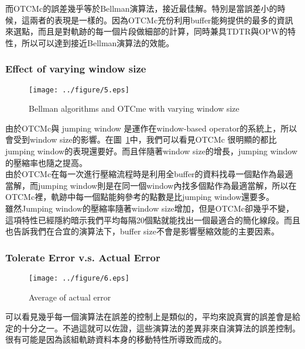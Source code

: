 \documentclass[12pt]{article}
\begin{document}
\begin{CJK}{UTF8}{bsmi}
而OTCMc的誤差幾乎等於Bellman演算法，接近最佳解。特別是當誤差小的時候，這兩者的表現是一樣的。因為OTCMc充份利用buffer能夠提供的最多的資訊來選點，而且是對軌跡的每一個片段做細部的計算，同時兼具TDTR與OPW的特性，所以可以達到接近Bellman演算法的效能。

\subsubsection{Effect of varying window size}
\begin{figure}[ht]
\begin{center}
\texttt{[image: ../figure/5.eps]}
\caption{Bellman algorithms and OTCme with varying window size}
\label{fig:fig5}
\end{center}
\end{figure}

由於OTCMc與 jumping window 是運作在window-based operator的系統上，所以會受到window size的影響。在圖~\ref{fig:fig5}中，我們可以看見OTCMc 很明顯的都比jumping window的表現還要好。而且伴隨著window size的增長，jumping window的壓縮率也隨之提高。\\

由於OTCMc在每一次進行壓縮流程時是利用全buffer的資料找尋一個點作為最適當解，而jumping window則是在同一個window內找多個點作為最適當解，所以在OTCMc裡，軌跡中每一個點能夠參考的點數是比jumping window還要多。\\

雖然Jumping window的壓縮率隨著window size增加，但是OTCMc卻幾乎不變，這項特性已經隱約暗示我們平均每隔20個點就能找出一個最適合的簡化線段。而且也告訴我們在合宜的演算法下，buffer size不會是影響壓縮效能的主要因素。

\subsubsection{Tolerate Error v.s. Actual Error}

\begin{figure}[ht]
\begin{center}
\texttt{[image: ../figure/6.eps]}
\caption{Average of actual error}
\label{fig:fig6}
\end{center}
\end{figure}

可以看見幾乎每一個演算法在誤差的控制上是類似的，平均來說真實的誤差會是給定的十分之一。不過這就可以佐證，這些演算法的差異非來自演算法的誤差控制。很有可能是因為該組軌跡資料本身的移動特性所導致而成的。



\end{CJK}
\end{document}
